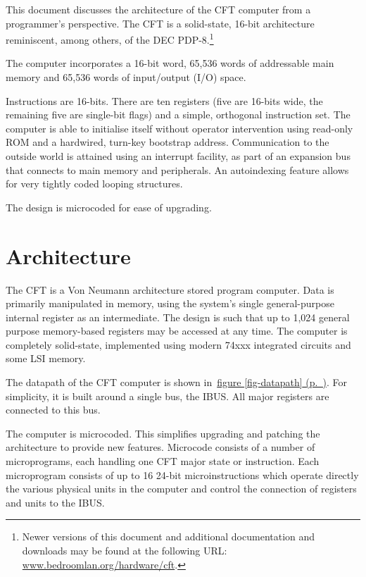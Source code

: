 \documentclass[11pt,a4paper,twocolumns]{article}
\newcommand{\cf}[2][section]{\hyperref[#2]{#1 \ref*{#2} (p.~\pageref*{#2})}}
\newcommand{\fcf}[1]{\cf[figure]{#1}}
\newcommand\link[1]{\sf\href{http://#1}{#1}}
\newcommand\bus[1]{{#1}}
\newcommand\IBUS{\bus{IBUS}}
\begin{document}
  This document discusses the architecture of the CFT computer from a
  programmer's perspective. The CFT is a solid-state, 16-bit
  architecture reminiscent, among others, of the DEC
  PDP-8.\footnote{Newer versions of this document and additional
    documentation and downloads may be found at the following URL:\\
    \link{www.bedroomlan.org/hardware/cft}.}

  The computer incorporates a 16-bit word, 65,536 words of addressable
  main memory and 65,536 words of input/output (I/O) space.

  Instructions are 16-bits. There are ten registers (five are 16-bits
  wide, the remaining five are single-bit flags) and a simple,
  orthogonal instruction set. The computer is able to initialise
  itself without operator intervention using read-only ROM and a
  hardwired, turn-key bootstrap address. Communication to the outside
  world is attained using an interrupt facility, as part of an
  expansion bus that connects to main memory and peripherals. An
  autoindexing feature allows for very tightly coded looping
  structures.

  The design is microcoded for ease of upgrading.

\section{Architecture}

The CFT is a Von Neumann architecture stored program computer. Data is
primarily manipulated in memory, using the system's single
general-purpose internal register as an intermediate. The design is
such that up to 1,024 general purpose memory-based registers may be
accessed at any time. The computer is completely solid-state,
implemented using modern 74xxx integrated circuits and some LSI
memory.

The datapath of the CFT computer is shown in~\fcf{fig-datapath}. For
simplicity, it is built around a single bus, the \IBUS. All major
registers are connected to this bus.

The computer is microcoded. This simplifies upgrading and patching the
architecture to provide new features. Microcode consists of a number
of microprograms, each handling one CFT major state or
instruction. Each microprogram consists of up to 16 24-bit
microinstructions which operate directly the various physical units in
the computer and control the connection of registers and units to the
\IBUS.
\end{document}
